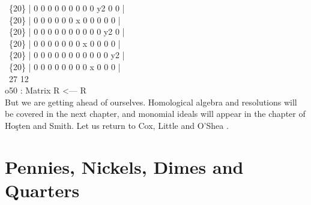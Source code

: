 \      \{20\} | 0   0   0   0   0   0   0   0   0   y2  0   0   |\\
\      \{20\} | 0   0   0   0   0   0   x   0   0   0   0   0   |\\
\      \{20\} | 0   0   0   0   0   0   0   0   0   0   y2  0   |\\
\      \{20\} | 0   0   0   0   0   0   0   x   0   0   0   0   |\\
\      \{20\} | 0   0   0   0   0   0   0   0   0   0   0   y2  |\\
\      \{20\} | 0   0   0   0   0   0   0   0   x   0   0   0   |\\
\emptyLine
\              27       12\\
o50 : Matrix R   <--- R\\
\endOutput
But we are getting ahead of ourselves. Homological algebra and resolutions
will be covered in the next chapter, and monomial ideals
will appear in the chapter of Ho\c{s}ten and Smith.
Let us return to Cox, Little and O'Shea \cite{CLO2}.

\section{Pennies, Nickels, Dimes and Quarters}

